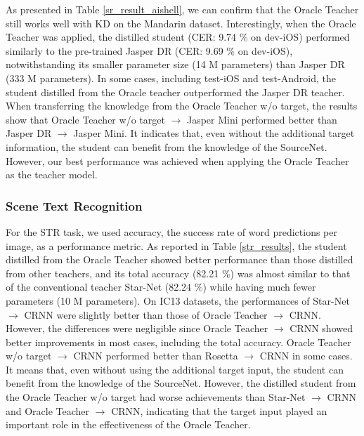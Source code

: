 \documentclass[journal]{IEEEtran}
\begin{document}
As presented in Table \ref{sr_result_aishell}, we can confirm that the Oracle Teacher still works well with KD on the Mandarin dataset.
Interestingly, when the Oracle Teacher was applied, the distilled student (CER: 9.74 \% on dev-iOS) performed similarly to the pre-trained Jasper DR (CER: 9.69 \% on dev-iOS), notwithstanding its smaller parameter size (14 M parameters) than Jasper DR (333 M parameters). In some cases, including test-iOS and test-Android, the student distilled from the Oracle teacher outperformed the Jasper DR teacher.
When transferring the knowledge from the Oracle Teacher w/o target, the results show that Oracle Teacher w/o target $\rightarrow$ Jasper Mini performed better than Jasper DR $\rightarrow$ Jasper Mini.
It indicates that, even without the additional target information, the student can benefit from the knowledge of the SourceNet.
However, our best performance was achieved when applying the Oracle Teacher as the teacher model.



\subsubsection{Scene Text Recognition} 
For the STR task, we used accuracy, the success rate of word predictions per image, as a performance metric. 
As reported in Table \ref{str_results}, the student distilled from the Oracle Teacher showed better performance than those distilled from other teachers, and its total accuracy (82.21 \%) was almost similar to that of the conventional teacher Star-Net (82.24 \%) while having much fewer parameters (10 M parameters).
On IC13 datasets, the performances of Star-Net $\rightarrow$ CRNN were slightly better than those of Oracle Teacher $\rightarrow$ CRNN.
However, the differences were negligible since Oracle Teacher $\rightarrow$ CRNN showed better improvements in most cases, including the total accuracy.
Oracle Teacher w/o target $\rightarrow$ CRNN performed better than Rosetta $\rightarrow$ CRNN in some cases. 
It means that, even without using the additional target input, the student can benefit from the knowledge of the SourceNet. 
However, the distilled student from the Oracle Teacher w/o target had worse achievements than Star-Net $\rightarrow$ CRNN and Oracle Teacher $\rightarrow$ CRNN, indicating that the target input played an important role in the effectiveness of the Oracle Teacher.
\end{document}
